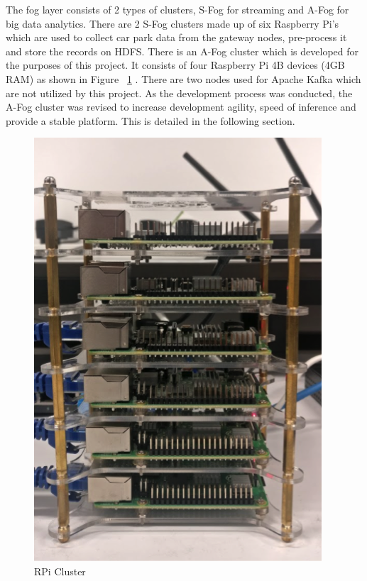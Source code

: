     
    \begin{flushleft}
        
        The fog layer consists of 2 types of clusters, S-Fog for streaming and A-Fog for big data analytics. There are 2 S-Fog clusters made up of six Raspberry Pi’s which are used to collect car park data from the gateway nodes, pre-process it and store the records on HDFS. There is an A-Fog cluster which is developed for the purposes of this project. It consists of four Raspberry Pi 4B devices (4GB RAM) as shown in Figure ~\ref{fig:RPi Cluster} . There are two nodes used for Apache Kafka which are not utilized by this project. As the development process was conducted, the A-Fog cluster was revised to increase development agility, speed of inference and provide a stable platform. This is detailed in the following section.
        \begin{figure}[H]
      
          \includegraphics[scale=0.8]{images/RpiCluster.png}
          \caption{RPi Cluster}
          \label{fig:RPi Cluster}
        \end{figure}
     
    \end{flushleft}
    
